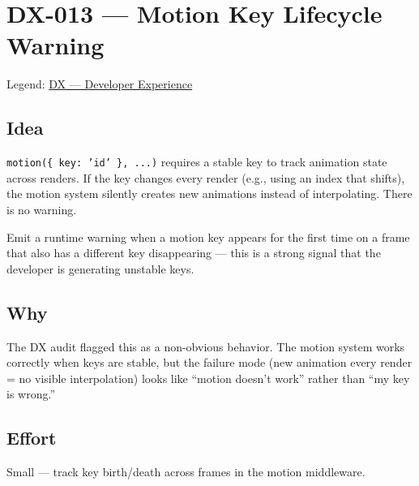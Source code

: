\chapter{DX-013 --- Motion Key Lifecycle Warning}\label{record-318}

\smallskip

Legend: \href{https://github.com/flyingrobots/bijou/blob/cbd70612140e7a450d764b3c7be1c6af878b99bc/docs/method/graveyard/legends/DX-developer-experience.md}{DX --- Developer Experience}

\section{Idea}\label{record-318-idea}

\texttt{m\allowbreak{}o\allowbreak{}t\allowbreak{}i\allowbreak{}o\allowbreak{}n\allowbreak{}(\allowbreak{}\{\allowbreak{} \allowbreak{}k\allowbreak{}e\allowbreak{}y\allowbreak{}:\allowbreak{} \allowbreak{}'\allowbreak{}i\allowbreak{}d\allowbreak{}'\allowbreak{} \allowbreak{}\}\allowbreak{},\allowbreak{} \allowbreak{}.\allowbreak{}.\allowbreak{}.\allowbreak{})} requires a stable key to track animation state across renders. If the key changes every render (e.g., using an index that shifts), the motion system silently creates new animations instead of interpolating. There is no warning.

Emit a runtime warning when a motion key appears for the first time on a frame that also has a different key disappearing --- this is a strong signal that the developer is generating unstable keys.

\section{Why}\label{record-318-why}

The DX audit flagged this as a non-obvious behavior. The motion system works correctly when keys are stable, but the failure mode (new animation every render = no visible interpolation) looks like ``motion doesn't work'' rather than ``my key is wrong.''

\section{Effort}\label{record-318-effort}

Small --- track key birth/death across frames in the motion middleware.

